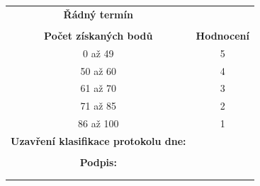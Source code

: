 \documentclass[a4paper,12pt]{report}
\begin{document}
\begin{tabular}{|c|c|}
 \hline
\textbf{Řádný termín}                        &                    \\
                                             &                    \\\hline
\textbf{Počet získaných bodů}                & \textbf{Hodnocení} \\\hline
0 až 49                                      & 5                  \\\hline
50 až 60                                     & 4                  \\\hline
61 až 70                                     & 3                  \\\hline
71 až 85                                     & 2                  \\\hline
86 až 100                                    & 1                  \\\hline
\textbf{Uzavření klasifikace protokolu dne:} &                    \\
                                             &                    \\
\textbf{Podpis:}                             &                    \\
                                             &                    \\
                                             &                    \\\hline

    
\end{tabular}
\end{document}
